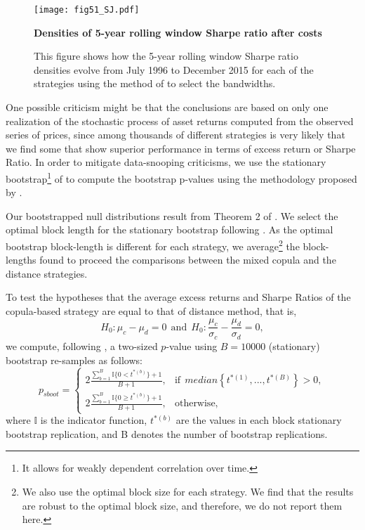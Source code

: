 \documentclass[a4paper]{article}
\begin{document}
\begin{figure}[H]
	\centering
	\texttt{[image: fig51\_SJ.pdf]}
	\caption{\textbf{Densities of 5-year rolling window Sharpe ratio after costs}}
	\caption*{\scriptsize This figure shows how the 5-year rolling window Sharpe ratio densities evolve from July 1996 to December 2015 for each of the strategies using the method of \citet*{sj1991} to select the bandwidths.}
	\label{fig:fig51}
\end{figure}

One possible criticism might be that the conclusions are based on only one realization of the stochastic process of asset returns computed from the observed series of prices, since among thousands of different strategies is very likely that we find some that show superior performance in terms of excess return or Sharpe Ratio. In order to mitigate data-snooping criticisms, we use the stationary bootstrap\footnote{It allows for weakly dependent correlation over time.} of \citet*{pr94} to compute the bootstrap p-values using the methodology proposed by \citet*{lw08}. 

Our bootstrapped null distributions result from Theorem 2 of \citet*{pr94}. We select the optimal block length for the stationary bootstrap following \citet*{pw04}. As the optimal bootstrap block-length is different for each strategy, we average\footnote{We also use the optimal block size for each strategy. We find that the results are robust to the optimal block size, and therefore, we do not report them here.} the block-lengths found to proceed the comparisons between the mixed copula and the distance strategies.

To test the hypotheses that the average excess returns and Sharpe Ratios of the copula-based strategy are equal to that of distance method, that is,
\begin{equation}
H_{0}:\mu_{c}-\mu_{d}=0  \ \ \textrm{and}
\ \  H_{0}:\frac{\mu_{c}}{\sigma_{c}}-\frac{\mu_{d}}{\sigma_{d}}=0,
\label{eq:eq153}
\end{equation}
we compute, following \citet*{davison1997}, a two-sized $p$-value using $B=10000$ (stationary) bootstrap re-samples as follows:
\begin{equation}
p_{sboot}=
\begin{cases}
2\frac{\sum_{b=1}^{B}\mathbb{I}\{0< t^{\ast(b)}\}+1}{B+1}, &\text{if} ~~median\left\{ t^{\ast \left( 1\right) },...,t^{\ast \left( B\right)}\right\} > 0, \\
2\frac{\sum_{b=1}^{B}\mathbb{I}\{0\geq t^{\ast(b)}\}+1}{B+1}, &\text{otherwise},
\end{cases}
\label{eq:eq152}
\end{equation}
where $\mathbb{I}$ is the indicator function, $t^{\ast(b)}$ are the values in each block stationary bootstrap replication, and B denotes the number of bootstrap replications.
\end{document}
